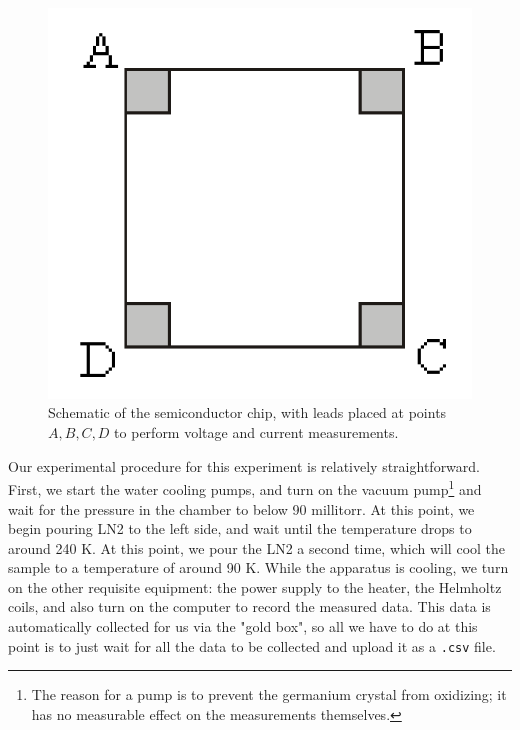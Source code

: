 \documentclass[10pt]{article}
\begin{document}
	\begin{figure}
		\centering
		\includegraphics[scale=0.5]{images/setup-2.png}
		\caption{Schematic of the semiconductor chip, with leads placed at points \( A, B, C, D \) to perform
		voltage and current measurements.}
		\label{setup-2}
	\end{figure}
	Our experimental procedure for this experiment is relatively straightforward. First, we start the water
	cooling pumps, and turn on the 
	vacuum pump\footnote{The reason for a pump is to prevent the germanium crystal from oxidizing; it has no
	measurable effect on the measurements themselves.} and wait for the pressure in the chamber to below 
	90 millitorr. At this
	point, we begin pouring LN2 to the left side, and wait until the temperature drops to around 
	240 K. At this point, we pour the LN2 a second time, which will cool the sample to a temperature of
	around 90 K. While the apparatus is cooling, we turn on the other requisite equipment: the power supply
	to the heater, the Helmholtz coils, and also turn on the computer to record the measured data. This data
	is automatically collected for us via the "gold box", so all we have to do at this point is to just wait
	for all the data to be collected and upload it as a \texttt{.csv} file. 
\end{document}
